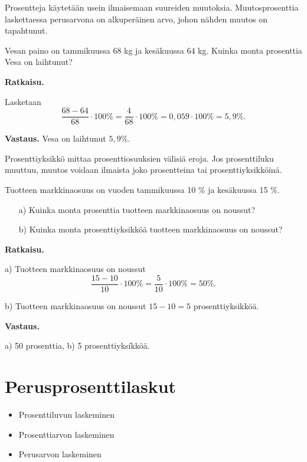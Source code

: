 Prosentteja käytetään usein ilmaisemaan suureiden muutoksia. Muutosprosenttia laskettaessa perusarvona on alkuperäinen arvo, johon nähden muutos on tapahtunut.

\begin{esimerkki}
    Vesan paino on tammikuussa 68 kg ja kesäkuussa 64 kg. Kuinka monta prosenttia Vesa on laihtunut?

    {\bf Ratkaisu.}

    Lasketaan 
    \[
    \frac{68-64}{68}\cdot 100\% = \frac{4}{68} \cdot 100\%=0,059\cdot 100\% =5,9\%.
    \]
    
    {\bf Vastaus.}
    Vesa on laihtunut $5,9\%$.
\end{esimerkki}


Prosenttiyksikkö mittaa prosenttiosuuksien välisiä eroja. Jos prosenttiluku muuttuu, muutos voidaan ilmaista joko prosentteina tai prosenttiyksikköinä.


\begin{esimerkki}
    Tuotteen markkinaosuus on vuoden tammikuussa 10 \% ja kesäkuussa 15 \%. 
    \begin{enumerate}
    \item[a)]
    Kuinka monta prosenttia tuotteen markkinaosuus on noussut?
    
    \item[b)] Kuinka monta prosenttiyksikköä tuotteen markkinaosuus on noussut?
    \end{enumerate}
    
    {\bf Ratkaisu.} 
    
    a) Tuotteen markkinaosuus on noussut
    \[
    \frac{15-10}{10} \cdot 100 \%= \frac{5}{10}\cdot 100\% = 50\%.
    \]
    
    b) Tuotteen markkinaosuus on noussut $15-10=5$ prosenttiyksikköä. 
    
    {\bf Vastaus.}
    
    a) 50 prosenttia, b) 5 prosenttiyksíkköä.
\end{esimerkki}




\section{Perusprosenttilaskut}

\begin{itemize}
	\item Prosenttiluvun laskeminen
	\item Prosenttiarvon laskeminen
	\item Perusarvon laskeminen
\end{itemize}

